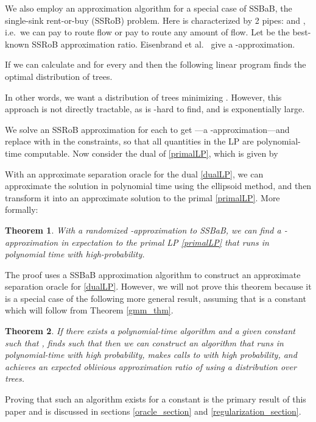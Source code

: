 \documentclass[11pt]{article}
\newtheorem{thm}{Theorem}[section]
\begin{document}
We also employ an approximation algorithm for a special case of SSBaB, the single-sink rent-or-buy (SSRoB) problem.  Here  is characterized by 2 pipes:  and , i.e.\ we can pay  to route  flow or pay  to route any amount of flow.  Let  be the best-known SSRoB approximation ratio.  Eisenbrand et al.~\cite{eisenbrand2008acf} give a -approximation.

If we can calculate  and  for every  and  then the following linear program finds the optimal distribution of trees.

In other words, we want a distribution  of trees minimizing .   However, this approach is not directly tractable, as  is -hard to find, and  is exponentially large.

We solve an SSRoB approximation for each  to get ---a -approximation---and replace  with  in the constraints, so that all quantities in the LP are polynomial-time computable.  
Now consider the dual of \eqref{primalLP}, which is given by

With an approximate separation oracle for the dual \eqref{dualLP}, we can approximate the solution in polynomial time using the ellipsoid method, and then transform it into an approximate solution to the primal \eqref{primalLP}.  More formally:

\begin{thm} \label{first_alg_thm} With a randomized -approximation to SSBaB, we can find a -approximation in expectation to the primal LP \eqref{primalLP} that runs in polynomial time with high-probability.
\end{thm}

The proof uses a SSBaB approximation algorithm to construct an approximate separation oracle for \eqref{dualLP}.  However, we will not prove this theorem because it is a special case of the following more general result, assuming that  is a constant which will follow from Theorem \ref{gmm_thm}.

\begin{thm}  \label{alg_thm}
If there exists a polynomial-time algorithm  and a given constant  such that ,  finds  such that  then we can construct an algorithm that runs in polynomial-time with high probability, makes  calls to  with high probability, and achieves an expected oblivious approximation ratio of  using a distribution over  trees.
\end{thm}

Proving that such an algorithm  exists for a constant  is the primary result of this paper and is discussed in sections \ref{oracle_section} and \ref{regularization_section}.
\end{document}
